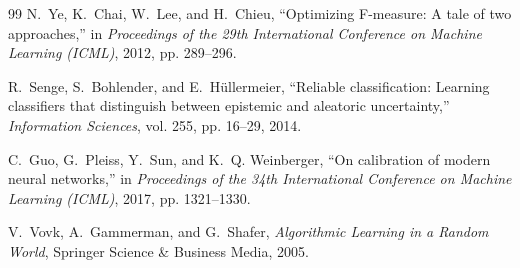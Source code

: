\documentclass[11pt,a4paper]{article}
\begin{document}
\begin{thebibliography}{99}
N.~Ye, K.~Chai, W.~Lee, and H.~Chieu,
\newblock ``Optimizing F-measure: A tale of two approaches,''
\newblock in \textit{Proceedings of the 29th International Conference on Machine Learning (ICML)}, 2012, pp. 289--296.

R.~Senge, S.~Bohlender, and E.~H\"ullermeier,
\newblock ``Reliable classification: Learning classifiers that distinguish between epistemic and aleatoric uncertainty,''
\newblock \textit{Information Sciences}, vol. 255, pp. 16--29, 2014.

C.~Guo, G.~Pleiss, Y.~Sun, and K.~Q. Weinberger,
\newblock ``On calibration of modern neural networks,''
\newblock in \textit{Proceedings of the 34th International Conference on Machine Learning (ICML)}, 2017, pp. 1321--1330.

V.~Vovk, A.~Gammerman, and G.~Shafer,
\newblock \textit{Algorithmic Learning in a Random World},
\newblock Springer Science \& Business Media, 2005.

\end{thebibliography}
\end{document}
